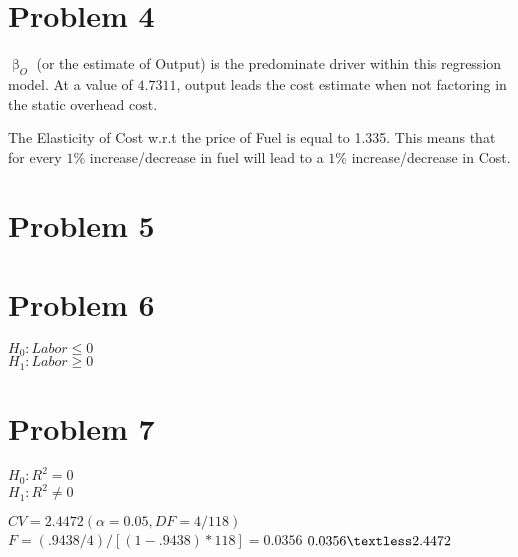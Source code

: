 \documentclass[11pt,letterpaper,english]{article}
\begin{document}
\section{Problem 4}
$\upbeta_O$ (or the estimate of Output) is the predominate driver within this regression model. At a value of $4.7311$, output leads the cost estimate when not factoring in the static overhead cost.

\vspace{5mm}
\noindent
The Elasticity of Cost w.r.t the price of Fuel is equal to 1.335. This means that for every $1\%$ increase/decrease in fuel will lead to a $1\%$ increase/decrease in Cost.


\section{Problem 5}

\section{Problem 6}
$H_0: Labor \leq 0$\\
$H_1: Labor \geq 0$




\section{Problem 7}
$H_0: R^2 = 0$\\
$H_1: R^2 \neq 0$

\vspace{5mm}
\noindent
$CV = 2.4472 (\alpha = 0.05, DF = 4 / 118)$
\newline
$F = (.9438 / 4) / [(1 - .9438) * 118] = 0.0356$
\newline
$0.0356 \textless 2.4472$
\end{document}
